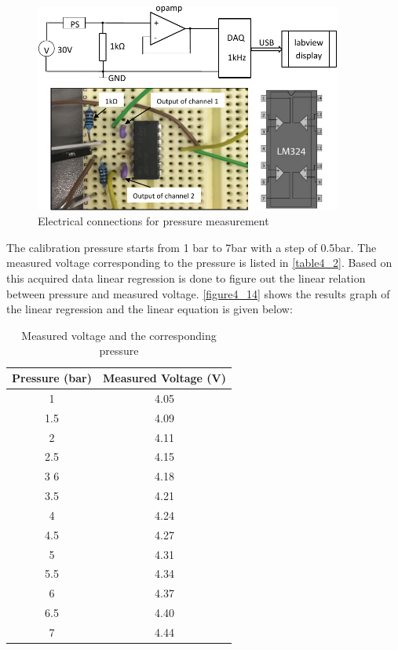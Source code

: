 \begin{figure}[h]%
\centering
\includegraphics[width=0.9\textwidth]{figures/packagingandtestunderhighpressure/figure4_13}%
\caption{Electrical connections for pressure measurement}%
\label{figure4_13}%
\end{figure}

The calibration pressure starts from 1 bar to 7bar with a step of 0.5bar. The measured voltage corresponding to the pressure is listed in \autoref{table4_2}. Based on this acquired data linear regression is done to figure out the linear relation between pressure and measured voltage. \autoref{figure4_14} shows the results graph of the linear regression and the linear equation is given below:

\begin{table}[!h]
    \centering
    \caption{Measured voltage and the corresponding pressure}
    \begin{tabular}{cc}
    \toprule
    Pressure (bar) & Measured Voltage (V) \\
    \midrule
    1 & 4.05\\
    1.5 & 4.09\\
    2 & 4.11\\
    2.5 & 4.15\\
    3 6 & 4.18\\
    3.5 & 4.21\\
    4 & 4.24\\
    4.5 & 4.27\\
    5 & 4.31\\
    5.5 & 4.34\\
    6 & 4.37\\
    6.5 & 4.40\\
    7 & 4.44\\
    \bottomrule
    \end{tabular}
    \label{table4_2}
\end{table}

